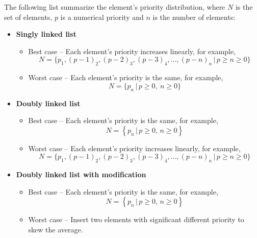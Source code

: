 \documentclass[a4paper,11pt]{kth-mag}
\newcommand*{\skippara}{\par\vspace{\baselineskip} \noindent}
\begin{document}
\skippara The following list summarize the element's priority distribution, where $N$ is the set of elements, $p$ is a numerical priority and $n$ is the number of elements:
\clearpage
\begin{itemize}
    \item \textbf{Singly linked list}
        \begin{itemize}
            \item Best case -- Each element's priority increases linearly, for example,
                \begin{equation*}
                    N = \Big\{p_1, (p-1)_2, (p-2)_3, (p-3)_4,...,(p-n)_n \, \Big| \, p \ge n \ge 0 \Big\}
                \end{equation*}
            \item Worst case -- Each element's priority is the same, for example,
                \begin{equation*}
                    N = \Big\{p_{n} \, \Big| \, p \ge 0,\ n \ge 0 \Big\}
                \end{equation*}
        \end{itemize}
    \item \textbf{Doubly linked list}
        \begin{itemize}
            \item Best case -- Each element's priority is the same, for example,
                \begin{equation*}
                    N = \left\{p_{n} \, \Big| \, p \ge 0,\, n \ge 0 \right\}
                \end{equation*}
            \item Worst case -- Each element's priority increases linearly, for example,
                \begin{equation*}
                    N = \Big\{p_1, (p-1)_2, (p-2)_3, (p-3)_4,...,(p-n)_n \, \Big| \, p \ge n\ge 0 \Big\}
                \end{equation*}
        \end{itemize}
    \item \textbf{Doubly linked list with modification}
        \begin{itemize}
            \item Best case -- Each element's priority is the same, for example,
                \begin{equation*}
                    N = \left\{p_{n} \, \Big| \, p \ge 0,\, n \ge 0 \right\}
                \end{equation*}
            \item Worst case -- Insert two elements with significant different priority to skew the average.

\end{itemize}
\end{itemize}
\end{document}
